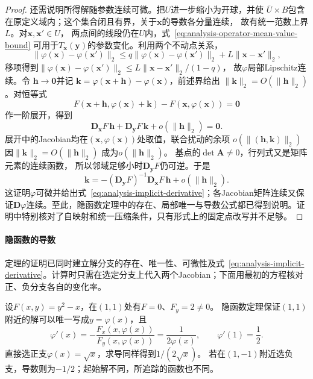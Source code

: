 \begin{proof}
还需说明所得解随参数连续可微。把$U$进一步缩小为开球，并使
$\overline U\times B$包含在原定义域内；这个集合闭且有界，关于$\bm x$的导数各分量连续，
故有统一范数上界$L$。对$\bm x,\bm x'\in U$，
两点间的线段仍在$U$内，式~\eqref{eq:analysis-operator-mean-value-bound}
可用于$T_{\bm x}(\bm y)$的参数变化。利用两个不动点关系，
\[   \lVert\varphi(\bm{x})-\varphi(\bm{x}')\rVert_2   \leq   q\lVert\varphi(\bm{x})-\varphi(\bm{x}')\rVert_2   +L\lVert\bm{x}-\bm{x}'\rVert_2, \]
移项得到$\lVert\varphi(\bm x)-\varphi(\bm x')\rVert_2
\leq L\lVert\bm x-\bm x'\rVert_2/(1-q)$，
故$\varphi$局部Lipschitz连续。令 $\bm{h}\to\bm{0}$并记 $\bm{k}=\varphi(\bm{x}+\bm{h})-\varphi(\bm{x})$，前述界给出 $\lVert\bm{k}\rVert_2=O(\lVert\bm{h}\rVert_2)$。对恒等式
\[   F(\bm{x}+\bm{h},\varphi(\bm{x})+\bm{k})   -   F(\bm{x},\varphi(\bm{x}))   =   \bm{0} \]
作一阶展开，得到
\[   \bm{D}_{\bm{x}}F\,\bm{h}   +   \bm{D}_{\bm{y}}F\,\bm{k}   +   o(\lVert\bm{h}\rVert_2)   =   \bm{0}. \]
展开中的Jacobian均在$(\bm x,\varphi(\bm x))$处取值，联合扰动的余项
$o(\lVert(\bm h,\bm k)\rVert_2)$因$\lVert\bm k\rVert_2=O(\lVert\bm h\rVert_2)$
成为$o(\lVert\bm h\rVert_2)$。
基点的$\det\bm A\neq0$，行列式又是矩阵元素的连续函数，
所以邻域足够小时$\bm D_{\bm y}F$仍可逆。于是
\[   \bm{k}   =   -   (\bm{D}_{\bm{y}}F)^{-1}   \bm{D}_{\bm{x}}F\,\bm{h}   +   o(\lVert\bm{h}\rVert_2). \]
这证明$\varphi$可微并给出式~\eqref{eq:analysis-implicit-derivative}；各Jacobian矩阵连续又保证$\bm{D}\varphi$连续。至此，隐函数定理中的存在、局部唯一与导数公式都已得到说明。证明中特别核对了自映射和统一压缩条件，只有形式上的固定点改写并不足够。
\end{proof}

\paragraph{隐函数的导数}

定理的证明已同时建立解分支的存在、唯一性、可微性及式~\eqref{eq:analysis-implicit-derivative}。计算时只需在选定分支上代入两个Jacobian；下面用最初的方程核对正、负分支各自的变化率。

\begin{example}[隐函数分支的导数]
设$F(x,y)=y^2-x$，在$(1,1)$处有$F=0$、$F_y=2\neq0$。
隐函数定理保证$(1,1)$附近的解可以唯一写成$y=\varphi(x)$，且
\[
 \varphi'(x)=-\frac{F_x(x,\varphi(x))}{F_y(x,\varphi(x))}
 =\frac1{2\varphi(x)},\qquad \varphi'(1)=\frac12.
\]
直接选正支$\varphi(x)=\sqrt x$，求导同样得到$1/(2\sqrt x)$。
若在$(1,-1)$附近选负支，导数则为$-1/2$；起始解不同，所追踪的函数也不同。
\end{example}



